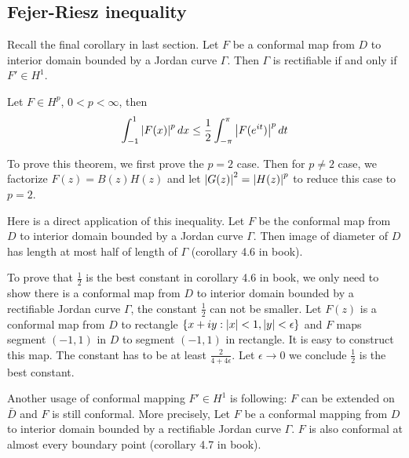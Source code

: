 \subsection{Fejer-Riesz inequality}
Recall the final corollary in last section. Let $F$ be a conformal map from $D$ to interior domain bounded by a Jordan curve $\Gamma$. Then $\Gamma$ is rectifiable if and only if $F'\in H^1$.
\begin{theorem}
    Let $F\in H^p$, $0<p<\infty$, then
    \begin{equation*}
        \int_{-1}^{1}{\left\lvert F(x)\right\rvert^p dx}\leq \frac{1}{2}\int_{-\pi}^{\pi}{\left\lvert F(e^{it})\right\rvert^p d t}
    \end{equation*}
\end{theorem}\par
To prove this theorem, we first prove the $p=2$ case. Then for $p\neq 2$ case, we factorize $F(z)=B(z)H(z)$ and let $\left\lvert G(z)\right\rvert^2=\left\lvert H(z)\right\rvert^p$
to reduce this case to $p=2$.\par
Here is a direct application of this inequality. Let $F$ be the conformal map from $D$ to interior domain bounded by a Jordan curve $\Gamma$. Then image of diameter of $D$ has length at most half of length of $\Gamma$ (corollary 4.6 in book).\par
\begin{remark}
    To prove that $\frac{1}{2}$ is the best constant in corollary 4.6 in book, we only need to show there is a conformal map
    from $D$ to interior domain bounded by a rectifiable Jordan curve $\Gamma$, the constant $\frac{1}{2}$ can not be smaller. Let $F(z)$ is
    a conformal map from $D$ to rectangle $\{x+iy:\left\lvert x\right\rvert<1,\left\lvert y\right\rvert<\epsilon\}$ and $F$ maps segment $(-1,1)$ in $D$ to segment $(-1,1)$
    in rectangle. It is easy to construct this map. The constant has to be at least $\frac{2}{4+4\epsilon}$. Let $\epsilon\to 0$ we conclude
    $\frac{1}{2}$ is the best constant.
\end{remark}
Another usage of conformal mapping $F'\in H^1$ is following: $F$ can be extended on $\bar{D}$ and $F$ is still conformal. More precisely,
Let $F$ be a conformal mapping from $D$ to interior domain bounded by a rectifiable Jordan curve $\Gamma$. $F$ is also conformal at
almost every boundary point (corollary 4.7 in book).
